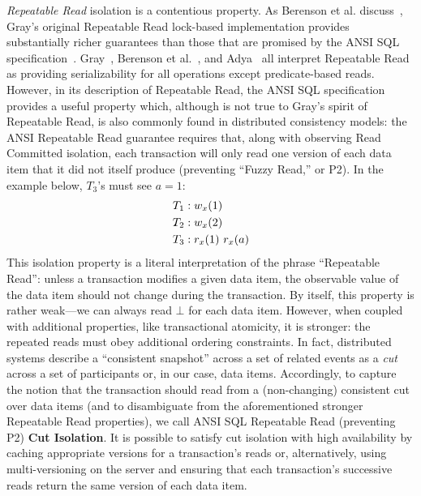 \textit{Repeatable Read} isolation is a contentious property. As
Berenson et al. discuss~\cite{ansicritique}, Gray's original
Repeatable Read lock-based implementation provides substantially
richer guarantees than those that are promised by the ANSI SQL
specification~\cite{gray-isolation}. Gray~\cite{gray-isolation},
Berenson et al.~\cite{ansicritique}, and Adya~\cite{adya} all
interpret Repeatable Read as providing serializability for all
operations except predicate-based reads. However, in its description
of Repeatable Read, the ANSI SQL specification provides a useful
property which, although is not true to Gray's spirit of Repeatable
Read, is also commonly found in distributed consistency models: the
ANSI Repeatable Read guarantee requires that, along with observing
Read Committed isolation, each transaction will only read one version
of each data item that it did not itself produce (preventing ``Fuzzy
Read,'' or P2). In the example below, $T_3$'s must see $a=1$:
\begin{align*}
\small
T_1 &: w_x(1)
\\T_2 &: w_x(2)
\\T_3 &: r_x(1)~r_x(a)
\end{align*}
This isolation property is a literal interpretation of the phrase
``Repeatable Read'': unless a transaction modifies a given data item,
the observable value of the data item should not change during the
transaction. By itself, this property is rather weak---we can always
read $\bot$ for each data item. However, when coupled with additional
properties, like transactional atomicity, it is stronger: the repeated
reads must obey additional ordering constraints. In fact, distributed
systems describe a ``consistent snapshot'' across a set of related
events as a \textit{cut} across a set of participants or, in our case,
data items. Accordingly, to capture the notion that the transaction
should read from a (non-changing) consistent cut over data items (and
to disambiguate from the aforementioned stronger Repeatable Read
properties), we call ANSI SQL Repeatable Read (preventing P2)
\textbf{Cut Isolation}. It is possible to satisfy cut isolation with
high availability by caching appropriate versions for a transaction's
reads or, alternatively, using multi-versioning on the server and
ensuring that each transaction's successive reads return the same
version of each data item.

